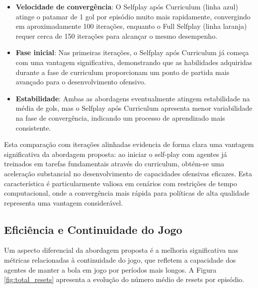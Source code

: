 \begin{itemize}
    \item \textbf{Velocidade de convergência}: O Selfplay após Curriculum (linha azul) atinge o patamar de 1 gol por episódio muito mais rapidamente, convergindo em aproximadamente 100 iterações, enquanto o Full Selfplay (linha laranja) requer cerca de 150 iterações para alcançar o mesmo desempenho.
    
    \item \textbf{Fase inicial}: Nas primeiras iterações, o Selfplay após Curriculum já começa com uma vantagem significativa, demonstrando que as habilidades adquiridas durante a fase de curriculum proporcionam um ponto de partida mais avançado para o desenvolvimento ofensivo.
    
    \item \textbf{Estabilidade}: Ambas as abordagens eventualmente atingem estabilidade na média de gols, mas o Selfplay após Curriculum apresenta menor variabilidade na fase de convergência, indicando um processo de aprendizado mais consistente.
\end{itemize}

Esta comparação com iterações alinhadas evidencia de forma clara uma vantagem significativa da abordagem proposta: ao iniciar o self-play com agentes já treinados em tarefas fundamentais através do curriculum, obtém-se uma aceleração substancial no desenvolvimento de capacidades ofensivas eficazes. Esta característica é particularmente valiosa em cenários com restrições de tempo computacional, onde a convergência mais rápida para políticas de alta qualidade representa uma vantagem considerável.

\subsection{Eficiência e Continuidade do Jogo}

Um aspecto diferencial da abordagem proposta é a melhoria significativa nas métricas relacionadas à continuidade do jogo, que refletem a capacidade dos agentes de manter a bola em jogo por períodos mais longos. A Figura \ref{fig:total_resets} apresenta a evolução do número médio de resets por episódio.

